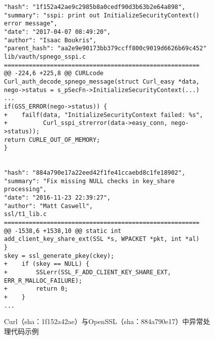 \begin{figure}[t]
	\centering
\begin{lstlisting}
"hash": "1f152a42ae9c2985b8a0cedf90d3b63b2e64a898",
"summary": "sspi: print out InitializeSecurityContext() error message",
"date": "2017-04-07 08:49:20",
"author": "Isaac Boukris",
"parent_hash": "aa2e9e90173bb379ccff800c9019d6626b69c452"
lib/vauth/spnego_sspi.c
=======================================================
@@ -224,6 +225,8 @@ CURLcode Curl_auth_decode_spnego_message(struct Curl_easy *data,
nego->status = s_pSecFn->InitializeSecurityContext(...)
...
if(GSS_ERROR(nego->status)) {
+    failf(data, "InitializeSecurityContext failed: %s",
+          Curl_sspi_strerror(data->easy_conn, nego->status));
return CURLE_OUT_OF_MEMORY;
}


"hash": "884a790e17a22eed42f1fe41ccaebd8c1fe18902",
"summary": "Fix missing NULL checks in key_share processing",
"date": "2016-11-23 22:39:27",
"author": "Matt Caswell",
ssl/t1_lib.c
=======================================================
@@ -1538,6 +1538,10 @@ static int add_client_key_share_ext(SSL *s, WPACKET *pkt, int *al)
}
skey = ssl_generate_pkey(ckey);
+    if (skey == NULL) {
+        SSLerr(SSL_F_ADD_CLIENT_KEY_SHARE_EXT, ERR_R_MALLOC_FAILURE);
+        return 0;
+    }
...
\end{lstlisting}
	\caption{
	Curl（sha：1f152a42ae）与OpenSSL（sha：884a790e17）中异常处理代码示例
	}
	\label{fig:2-3-ieh-3}
\end{figure}